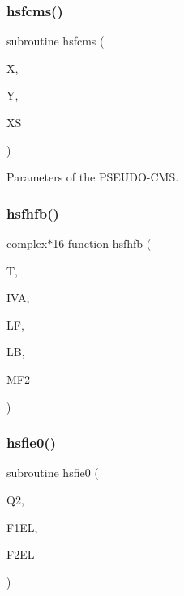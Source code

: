 \mbox{\label{djangoh__h_8f_aca93deed45eb2f3e098f49a98e41a213}} 
\subsubsection{\texorpdfstring{hsfcms()}{hsfcms()}}
{\footnotesize\ttfamily subroutine hsfcms (\begin{DoxyParamCaption}\item[{}]{X,  }\item[{}]{Y,  }\item[{}]{XS }\end{DoxyParamCaption})}



Parameters of the P\+S\+E\+U\+D\+O-\/\+C\+MS. 

\mbox{\label{djangoh__h_8f_a5d39508d58f522981aa44d59b8d1d957}} 
\subsubsection{\texorpdfstring{hsfhfb()}{hsfhfb()}}
{\footnotesize\ttfamily complex$\ast$16 function hsfhfb (\begin{DoxyParamCaption}\item[{}]{T,  }\item[{}]{I\+VA,  }\item[{}]{LF,  }\item[{}]{LB,  }\item[{}]{M\+F2 }\end{DoxyParamCaption})}

\mbox{\label{djangoh__h_8f_a8c3ca4edf306f5b2b276da4dfee854d7}} 
\subsubsection{\texorpdfstring{hsfie0()}{hsfie0()}}
{\footnotesize\ttfamily subroutine hsfie0 (\begin{DoxyParamCaption}\item[{}]{Q2,  }\item[{}]{F1\+EL,  }\item[{}]{F2\+EL }\end{DoxyParamCaption})}



